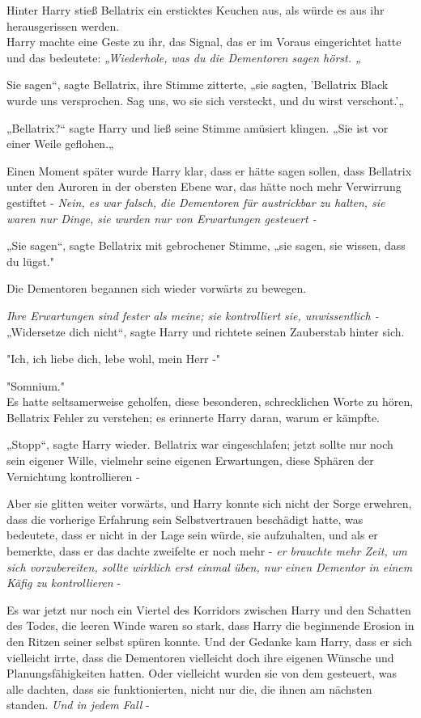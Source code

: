 {Hinter Harry stieß Bellatrix ein ersticktes Keuchen aus, als würde es aus ihr herausgerissen werden.\\ Harry machte eine Geste zu ihr, das Signal, das er im Voraus eingerichtet hatte und das bedeutete: \emph{„Wiederhole, was du die Dementoren sagen hörst. „}

Sie sagen“, sagte Bellatrix, ihre Stimme zitterte, „sie sagten, 'Bellatrix Black wurde uns versprochen. Sag uns, wo sie sich versteckt, und du wirst verschont.'„

„Bellatrix?“ sagte Harry und ließ seine Stimme amüsiert klingen. „Sie ist vor einer Weile geflohen.„

Einen Moment später wurde Harry klar, dass er hätte sagen sollen, dass Bellatrix unter den Auroren in der obersten Ebene war, das hätte noch mehr Verwirrung gestiftet - \emph{Nein, es war falsch, die Dementoren für austrickbar zu halten, sie waren nur Dinge, sie wurden nur von Erwartungen gesteuert -}

„Sie sagen“, sagte Bellatrix mit gebrochener Stimme, „sie sagen, sie wissen, dass du lügst."

Die Dementoren begannen sich wieder vorwärts zu bewegen.

\emph{Ihre Erwartungen sind fester als meine; sie kontrolliert sie, unwissentlich -}\\ „Widersetze dich nicht“, sagte Harry und richtete seinen Zauberstab hinter sich.

"Ich, ich liebe dich, lebe wohl, mein Herr -"

"Somnium."\\ Es hatte seltsamerweise geholfen, diese besonderen, schrecklichen Worte zu hören, Bellatrix Fehler zu verstehen; es erinnerte Harry daran, warum er kämpfte.

„Stopp“, sagte Harry wieder. Bellatrix war eingeschlafen; jetzt sollte nur noch sein eigener Wille, vielmehr seine eigenen Erwartungen, diese Sphären der Vernichtung kontrollieren -

Aber sie glitten weiter vorwärts, und Harry konnte sich nicht der Sorge erwehren, dass die vorherige Erfahrung sein Selbstvertrauen beschädigt hatte, was bedeutete, dass er nicht in der Lage sein würde, sie aufzuhalten, und als er bemerkte, dass er das dachte zweifelte er noch mehr - \emph{er brauchte mehr Zeit, um sich vorzubereiten, sollte wirklich erst einmal üben, nur einen Dementor in einem Käfig zu kontrollieren} -

Es war jetzt nur noch ein Viertel des Korridors zwischen Harry und den Schatten des Todes, die leeren Winde waren so stark, dass Harry die beginnende Erosion in den Ritzen seiner selbst spüren konnte. Und der Gedanke kam Harry, dass er sich vielleicht irrte, dass die Dementoren vielleicht doch ihre eigenen Wünsche und Planungsfähigkeiten hatten. Oder vielleicht wurden sie von dem gesteuert, was alle dachten, dass sie funktionierten, nicht nur die, die ihnen am nächsten standen. \emph{Und in jedem Fall} -

}
